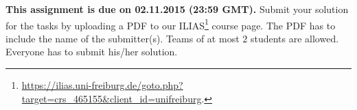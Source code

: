 \documentclass{exam}
\begin{document}
\noindent
{\bf This assignment is due on 02.11.2015 (23:59 GMT).} Submit your solution for the tasks by uploading a PDF to our ILIAS\footnote{ \url{https://ilias.uni-freiburg.de/goto.php?target=crs_465155&client_id=unifreiburg}.} course page. The PDF has to include the name of the submitter(s). Teams of at most $2$ students are allowed. Everyone has to submit his/her solution.  %
\end{document}

